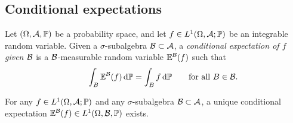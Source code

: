 \subsection{Conditional expectations}


\begin{defn}\label{defn:conditional-expectation} %
  Let $(\Omega, \mathcal{A}, \mathbb{P})$ be a probability space, and let $f \in L^1(\Omega, \mathcal{A}; \mathbb{P})$ be an integrable random variable.
  Given a $\sigma$-subalgebra $\mathcal{B} \subset \mathcal{A}$, a \emph{conditional expectation of $f$ given $\mathcal{B}$} is a $\mathcal{B}$-measurable random variable $\mathbb{E}^{\mathcal{B}}(f)$ such that
  \begin{equation}\label{eq:conditional-expectation-property}
    \qquad \int_B \mathbb{E}^{\mathcal{B}}(f) \, \mathrm{d}\mathbb{P} = \int_B f \, \mathrm{d}\mathbb{P} \qquad \text{for all $B \in \mathcal{B}$.}
  \end{equation}
\end{defn}


\begin{thm}\label{thm:conditional-expectation-EU}
  For any $f \in L^1(\Omega, \mathcal{A}; \mathbb{P})$ and any $\sigma$-subalgebra $\mathcal{B} \subset \mathcal{A}$, a unique conditional expectation $\mathbb{E}^{\mathcal{B}}(f) \in L^1(\Omega, \mathcal{B}, \mathbb{P})$ exists.
\end{thm}

